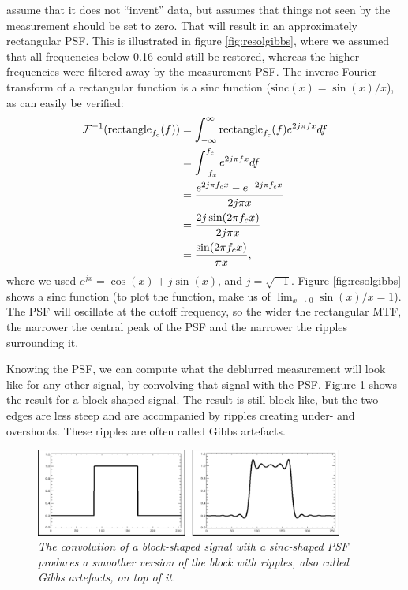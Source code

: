 \documentclass[11pt,oneside]{article}
\begin{document}
assume that it does not ``invent'' data, but assumes that things not
seen by the measurement should be set to zero. That will result in an
approximately rectangular PSF. This is illustrated in figure
\ref{fig:resolgibbs}, where we assumed that all frequencies below 0.16
could still be restored, whereas the higher frequencies were filtered
away by the measurement PSF. The inverse Fourier transform of a
rectangular function is a sinc function ($\mbox{sinc}(x) =
\sin(x)/x$), as can easily be verified:
\begin{align}
  {\cal F}^{-1}(\mbox{rectangle}_{f_c}(f))
  &= \int_{-\infty}^{\infty} \mbox{rectangle}_{f_c}(f) e^{2j\pi f x}
  df \nonumber\\
  &= \int_{-f_x}^{f_c} e^{2j\pi f x} df \nonumber\\
  &= \frac{e^{2j\pi f_c x} - e^{- 2j\pi f_c x}}{2j\pi x} \nonumber\\
  &= \frac{2j \sin(2\pi f_c x)}{2j\pi x} \nonumber\\
  &= \frac{\sin(2\pi f_c x)}{ \pi x},
\end{align}
where we used $e^{jx} = \cos(x) + j \sin(x)$, and $j =
\sqrt{-1}$. Figure \ref{fig:resolgibbs} shows a sinc function (to plot
the function, make us of $\lim_{x \rightarrow 0} \sin(x)/x = 1$). The PSF
will oscillate at the cutoff frequency, so the wider the rectangular
MTF, the narrower the central peak of the PSF and the narrower the
ripples surrounding it.

Knowing the PSF, we can compute what the deblurred measurement will
look like for any other signal, by convolving that signal with the
PSF. Figure \ref{fig:resolsinc} shows the result for a block-shaped
signal. The result is still block-like, but the two edges are less
steep and are accompanied by ripples creating under- and
overshoots. These ripples are often called Gibbs artefacts.

\begin{figure}[htb]
\centering
\includegraphics[width=0.9\textwidth]{figs/fig_resol_sinc.pdf}
\caption{\label{fig:resolsinc} \emph{The convolution of a block-shaped
    signal with a sinc-shaped PSF produces a smoother version of the
    block with ripples, also called Gibbs artefacts, on top of it.}}
\end{figure}
\end{document}
